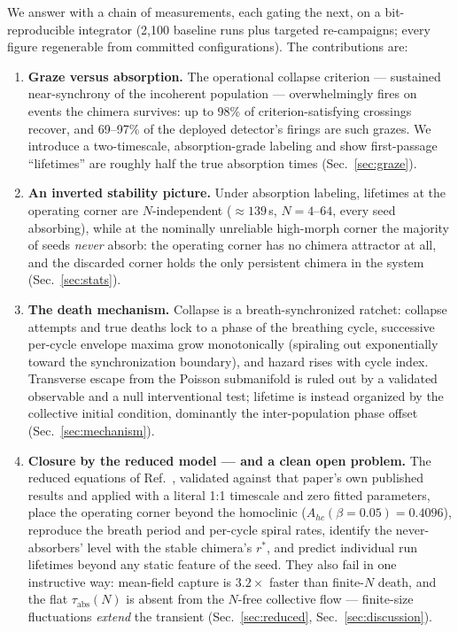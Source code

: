 \documentclass[aip,preprint,amsmath,amssymb]{revtex4-2}
\begin{document}
We answer with a chain of measurements, each gating the next, on a bit-reproducible
integrator (2{,}100 baseline runs plus targeted re-campaigns; every figure
regenerable from committed configurations). The contributions are:

\begin{enumerate}
\item \textbf{Graze versus absorption.} The operational collapse criterion ---
sustained near-synchrony of the incoherent population --- overwhelmingly fires on
events the chimera survives: up to 98\% of criterion-satisfying crossings recover,
and 69--97\% of the deployed detector's firings are such grazes. We introduce a
two-timescale, absorption-grade labeling and show first-passage ``lifetimes'' are
roughly half the true absorption times (Sec.~\ref{sec:graze}).
\item \textbf{An inverted stability picture.} Under absorption labeling, lifetimes at
the operating corner are $N$-independent ($\approx 139$\,s, $N = 4$--$64$, every seed
absorbing), while at the nominally unreliable high-morph corner the majority of seeds
\emph{never} absorb: the operating corner has no chimera attractor at all, and the
discarded corner holds the only persistent chimera in the system
(Sec.~\ref{sec:stats}).
\item \textbf{The death mechanism.} Collapse is a breath-synchronized ratchet:
collapse attempts and true deaths lock to a phase of the breathing cycle, successive
per-cycle envelope maxima grow monotonically (spiraling out exponentially toward the
synchronization boundary), and hazard rises with cycle index. Transverse escape from
the Poisson submanifold is ruled out by a validated observable and a null
interventional test; lifetime is instead organized by the collective initial
condition, dominantly the inter-population phase offset (Sec.~\ref{sec:mechanism}).
\item \textbf{Closure by the reduced model --- and a clean open problem.} The reduced
equations of Ref.~\cite{abrams2008}, validated against that paper's own published
results and applied with a literal 1:1 timescale and zero fitted parameters, place
the operating corner beyond the homoclinic ($A_{hc}(\beta{=}0.05) = 0.4096$),
reproduce the breath period and per-cycle spiral rates, identify the never-absorbers'
level with the stable chimera's $r^*$, and predict individual run lifetimes beyond
any static feature of the seed. They also fail in one instructive way: mean-field
capture is $3.2\times$ faster than finite-$N$ death, and the flat
$\tau_{\mathrm{abs}}(N)$ is absent from the $N$-free collective flow --- finite-size
fluctuations \emph{extend} the transient (Sec.~\ref{sec:reduced},
Sec.~\ref{sec:discussion}).
\end{enumerate}
\end{document}
